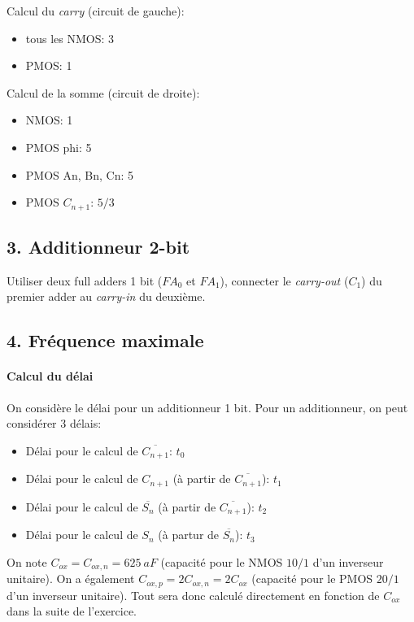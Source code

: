 \documentclass[frenchb,DIV=14]{scrartcl}
\begin{document}
Calcul du \emph{carry} (circuit de gauche):
\begin{itemize}
    \item tous les NMOS: 3
    \item PMOS: 1
\end{itemize}

Calcul de la somme (circuit de droite):
\begin{itemize}
    \item NMOS: 1
    \item PMOS phi: 5
    \item PMOS An, Bn, Cn: 5
    \item PMOS $C_{n+1}$: $5/3$
\end{itemize}

\subsection*{3. Additionneur 2-bit}

Utiliser deux full adders 1 bit ($FA_0$ et $FA_1$), connecter le 
\emph{carry-out} ($C_1$) du premier adder au \emph{carry-in} du deuxième. 

\subsection*{4. Fréquence maximale}

\paragraph{Calcul du délai}

On considère le délai pour un additionneur 1 bit.
Pour un additionneur, on peut considérer 3 délais:
\begin{itemize}
    \item Délai pour le calcul de $\overline{C_{n+1}}$: $t_0$
    \item Délai pour le calcul de $C_{n+1}$ (à partir de $\overline{C_{n+1}}$): $t_1$
    \item Délai pour le calcul de $\overline{S_n}$ (à partir de $\overline{C_{n+1}}$): $t_2$
    \item Délai pour le calcul de $S_n$ (à partur de $\overline{S_n}$): $t_3$
\end{itemize}

On note $C_{ox} = C_{ox,n} = \SI{625}{aF}$ (capacité pour le NMOS $10/1$ 
d'un inverseur unitaire). On a également $C_{ox,p} = 2C_{ox,n} = 2C_{ox}$ (capacité
pour le PMOS $20/1$ d'un inverseur unitaire). Tout sera
donc calculé directement en fonction de $C_{ox}$ dans la suite de l'exercice.\\
\end{document}
